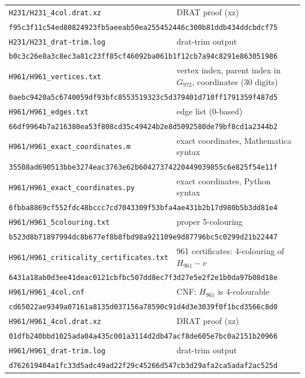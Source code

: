 \documentclass[10pt]{article}
\begin{document}
{\begin{longtable}{p{}p{}}
\texttt{H231/H231\_4col.drat.xz} & DRAT proof (xz) \\ \multicolumn{2}{l}{\scriptsize\texttt{f95c3f11c54ed80824923fb5aeeab50ea255452446c300b81ddb434ddcbdcf75}} \\
\texttt{H231/H231\_drat-trim.log} & drat-trim output \\ \multicolumn{2}{l}{\scriptsize\texttt{b0c3c26e8a3c8ec3a81c23ff85cf46092ba061b1f12cb7a94c8291e863051986}} \\
\texttt{H961/H961\_vertices.txt} & vertex index, parent index in $G_{972}$, coordinates (30 digits) \\ \multicolumn{2}{l}{\scriptsize\texttt{0aebc9420a5c6740059df93bfc8553519323c5d379401d710ff1791359f487d5}} \\
\texttt{H961/H961\_edges.txt} & edge list (0-based) \\ \multicolumn{2}{l}{\scriptsize\texttt{66df9964b7a216380ea53f808cd35c49424b2e8d5092580de79bf8cd1a2344b2}} \\
\texttt{H961/H961\_exact\_coordinates.m} & exact coordinates, Mathematica syntax \\ \multicolumn{2}{l}{\scriptsize\texttt{35508ad690513bbe3274eac3763e62b60427374220449039855c6e825f54e11f}} \\
\texttt{H961/H961\_exact\_coordinates.py} & exact coordinates, Python syntax \\ \multicolumn{2}{l}{\scriptsize\texttt{6fbba8869cf552fdc48bccc7cd7043309f53bfa4ae431b2b17d980b5b3dd81e4}} \\
\texttt{H961/H961\_5colouring.txt} & proper 5-colouring \\ \multicolumn{2}{l}{\scriptsize\texttt{b523d8b71897994dc8b677ef8b8fbd98a921109e9d87796bc5c0299d21b22447}} \\
\texttt{H961/H961\_criticality\_certificates.txt} & 961 certificates: 4-colouring of $H_{961}-v$ \\ \multicolumn{2}{l}{\scriptsize\texttt{6431a18ab0d3ee41deac0121cbfbc507dd8ec7f3d27e5e2f2e1b0da97b08d18e}} \\
\texttt{H961/H961\_4col.cnf} & CNF: $H_{961}$ is 4-colourable \\ \multicolumn{2}{l}{\scriptsize\texttt{cd65022ae9349a07161a8135d037156a78590c91d4d3e3039f0f1bcd3566c8d0}} \\
\texttt{H961/H961\_4col.drat.xz} & DRAT proof (xz) \\ \multicolumn{2}{l}{\scriptsize\texttt{01dfb240bbd1025ada04a435c001a3114d2db47acf8de605e7bc0a2151b20966}} \\
\texttt{H961/H961\_drat-trim.log} & drat-trim output \\ \multicolumn{2}{l}{\scriptsize\texttt{d762619404a1fc33d5adc49ad22f29c45266d547cb3d29afa2ca5adaf2ac525d}} \\

\end{longtable}}
\end{document}
